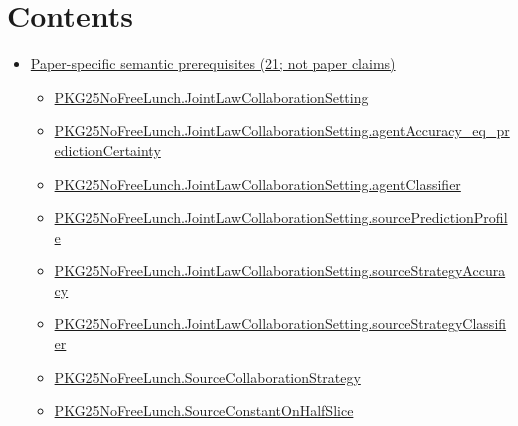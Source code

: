 \documentclass[10pt]{article}
\begin{document}
\section*{Contents}
\begin{itemize}[leftmargin=1.2em]
\item \hyperlink{paper-prerequisite-section-5ef5ef0364b6939c}{Paper-specific semantic prerequisites (21; not paper claims)}
\begin{itemize}[leftmargin=1.2em]
\item \hyperlink{paper-prerequisite-2df878eb3e0dbb6c}{PKG25\allowbreak{}No\allowbreak{}Free\allowbreak{}Lunch.\allowbreak{}Joint\allowbreak{}Law\allowbreak{}Collaboration\allowbreak{}Setting}
\item \hyperlink{paper-prerequisite-84af0bb2809cc6f7}{PKG25\allowbreak{}No\allowbreak{}Free\allowbreak{}Lunch.\allowbreak{}Joint\allowbreak{}Law\allowbreak{}Collaboration\allowbreak{}Setting.\allowbreak{}agent\allowbreak{}Accuracy\_\allowbreak{}eq\_\allowbreak{}prediction\allowbreak{}Certainty}
\item \hyperlink{paper-prerequisite-220441c661ffee1b}{PKG25\allowbreak{}No\allowbreak{}Free\allowbreak{}Lunch.\allowbreak{}Joint\allowbreak{}Law\allowbreak{}Collaboration\allowbreak{}Setting.\allowbreak{}agent\allowbreak{}Classifier}
\item \hyperlink{paper-prerequisite-b9f3281f3c9b6cca}{PKG25\allowbreak{}No\allowbreak{}Free\allowbreak{}Lunch.\allowbreak{}Joint\allowbreak{}Law\allowbreak{}Collaboration\allowbreak{}Setting.\allowbreak{}source\allowbreak{}Prediction\allowbreak{}Profile}
\item \hyperlink{paper-prerequisite-9bb2bbf635f9cd10}{PKG25\allowbreak{}No\allowbreak{}Free\allowbreak{}Lunch.\allowbreak{}Joint\allowbreak{}Law\allowbreak{}Collaboration\allowbreak{}Setting.\allowbreak{}source\allowbreak{}Strategy\allowbreak{}Accuracy}
\item \hyperlink{paper-prerequisite-f486e787b4ce5bbb}{PKG25\allowbreak{}No\allowbreak{}Free\allowbreak{}Lunch.\allowbreak{}Joint\allowbreak{}Law\allowbreak{}Collaboration\allowbreak{}Setting.\allowbreak{}source\allowbreak{}Strategy\allowbreak{}Classifier}
\item \hyperlink{paper-prerequisite-1c5a18642b851dc5}{PKG25\allowbreak{}No\allowbreak{}Free\allowbreak{}Lunch.\allowbreak{}Source\allowbreak{}Collaboration\allowbreak{}Strategy}
\item \hyperlink{paper-prerequisite-c23dd9d92cc157c4}{PKG25\allowbreak{}No\allowbreak{}Free\allowbreak{}Lunch.\allowbreak{}Source\allowbreak{}Constant\allowbreak{}On\allowbreak{}Half\allowbreak{}Slice}

\end{itemize}
\end{itemize}
\end{document}
